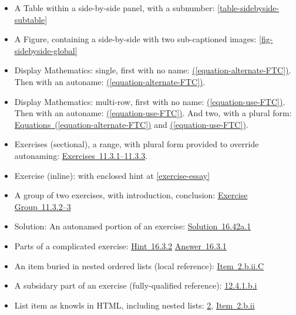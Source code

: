\documentclass[10pt,]{article}
\theoremstyle{plain}
\theoremstyle{definition}
\theoremstyle{definition}
\theoremstyle{definition}
\theoremstyle{definition}
\theoremstyle{definition}
\theoremstyle{definition}
\numberwithin{equation}{section}
\begin{document}
\begin{itemize}[label=\textbullet]
\item{}\hypertarget{p-544}{}%
A Table within a side-by-side panel, with a subnumber: \hyperref[table-sidebyside-subtable]{\ref{table-sidebyside-subtable}}%
\item{}\hypertarget{p-545}{}%
A Figure, containing a side-by-side with two sub-captioned images: \hyperref[fig-sidebyside-global]{\ref{fig-sidebyside-global}}%
\item{}\hypertarget{p-546}{}%
Display Mathematics: single, first with no name: \hyperref[equation-alternate-FTC]{(\ref{equation-alternate-FTC})}.  Then with an autoname: \hyperref[equation-alternate-FTC]{(\ref{equation-alternate-FTC})}.%
\item{}\hypertarget{p-547}{}%
Display Mathematics: multi-row, first with no name: \hyperref[equation-use-FTC]{(\ref{equation-use-FTC})}.  Then with an autoname: \hyperref[equation-use-FTC]{(\ref{equation-use-FTC})}.  And two, with a plural form: \hyperref[equation-alternate-FTC]{Equations~(\ref{equation-alternate-FTC})} and \hyperref[equation-use-FTC]{(\ref{equation-use-FTC})}.%
\item{}\hypertarget{p-548}{}%
Exercises (sectional), a range, with plural form provided to override autonaming: \hyperlink{exercises-null-problem}{Exercises~11.3.1--11.3.3}.%
\item{}\hypertarget{p-549}{}%
Exercise (inline): with enclosed hint at \hyperref[exercise-essay]{\ref{exercise-essay}}%
\item{}\hypertarget{p-550}{}%
A group of two exercises, with introduction, conclusion: \hyperlink{exercisegroup-two-problems}{Exercise Group~11.3.2--3}%
\item{}\hypertarget{p-551}{}%
Solution: An autonamed portion of an exercise: \hyperlink{solution-antiderivative}{Solution~16.42a.1}%
\item{}\hypertarget{p-552}{}%
Parts of a complicated exercise: \hyperlink{exercise-complicated-second-hint}{Hint~16.3.2} \hyperlink{exercise-complicated-first-answer}{Answer~16.3.1}%
\item{}\hypertarget{p-553}{}%
An item buried in nested ordered lists (local reference): \hyperlink{list-two-two-two-three}{Item~2.b.ii.C}%
\item{}\hypertarget{p-554}{}%
A subsidary part of an exercise (fully-qualified reference): \hyperlink{exercise-one-two-one}{12.4.1.b.i}%
\item{}\hypertarget{p-555}{}%
List item as knowls in HTML, including nested lists: \hyperlink{list-two}{2}, \hyperlink{list-two-two-two}{Item~2.b.ii}%

\end{itemize}
\end{document}
